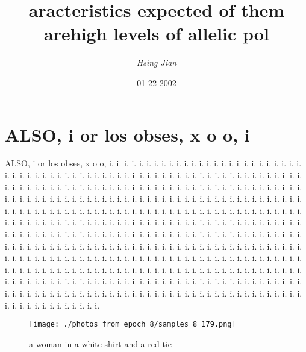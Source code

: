 \documentclass{article}%
\title{aracteristics expected of them arehigh levels of allelic pol}%
\author{\textit{Hsing Jian}}%
\date{01-22-2002}%
\begin{document}
%
\normalsize%
\maketitle%
\section{ALSO, i or los obses, x o o, i}%
\label{sec:ALSO,iorlosobses,xoo,i}%
ALSO, i or los obses, x o o, i. i. i. i. i. i. i. i. i. i. i. i. i. i. i. i. i. i. i. i. i. i. i. i. i. i. i. i. i. i. i. i. i. i. i. i. i. i. i. i. i. i. i. i. i. i. i. i. i. i. i. i. i. i. i. i. i. i. i. i. i. i. i. i. i. i. i. i. i. i. i. i. i. i. i. i. i. i. i. i. i. i. i. i. i. i. i. i. i. i. i. i. i. i. i. i. i. i. i. i. i. i. i. i. i. i. i. i. i. i. i. i. i. i. i. i. i. i. i. i. i. i. i. i. i. i. i. i. i. i. i. i. i. i. i. i. i. i. i. i. i. i. i. i. i. i. i. i. i. i. i. i. i. i. i. i. i. i. i. i. i. i. i. i. i. i. i. i. i. i. i. i. i. i. i. i. i. i. i. i. i. i. i. i. i. i. i. i. i. i. i. i. i. i. i. i. i. i. i. i. i. i. i. i. i. i. i. i. i. i. i. i. i. i. i. i. i. i. i. i. i. i. i. i. i. i. i. i. i. i. i. i. i. i. i. i. i. i. i. i. i. i. i. i. i. i. i. i. i. i. i. i. i. i. i. i. i. i. i. i. i. i. i. i. i. i. i. i. i. i. i. i. i. i. i. i. i. i. i. i. i. i. i. i. i. i. i. i. i. i. i. i. i. i. i. i. i. i. i. i. i. i. i. i. i. i. i. i. i. i. i. i. i. i. i. i. i. i. i. i. i. i. i. i. i. i. i. i. i. i. i. i. i. i. i. i. i. i. i. i. i. i. i. i. i. i. i. i. i. i. i. i. i. i. i. i. i. i. i. i. i. i. i. i. i. i. i. i. i. i. i. i. i. i. i. i. i. i. i. i. i. i. i. i. i. i. i. i. i. i. i. i. i. i. i. i. i. i. i. i. i. i. i. i. i. i. i. i. i. i. i. i. i. i. i. i. i. i. i. i. i. i. i. i. i. i. i. i. i. i. i. i. i. i. i. i. i. i. i. i. i. i. i. i. i. i. i. i. i. i. i. i. i. i. i. i. i. i. i. i. i. i. i. i. i. i. i. i. i. i. i. i. i. i. i. i. i. i. i.

%


\begin{figure}[h!]%
\centering%
\texttt{[image: ./photos\_from\_epoch\_8/samples\_8\_179.png]}%
\caption{a woman in a white shirt and a red tie}%
\end{figure}

%
\end{document}
